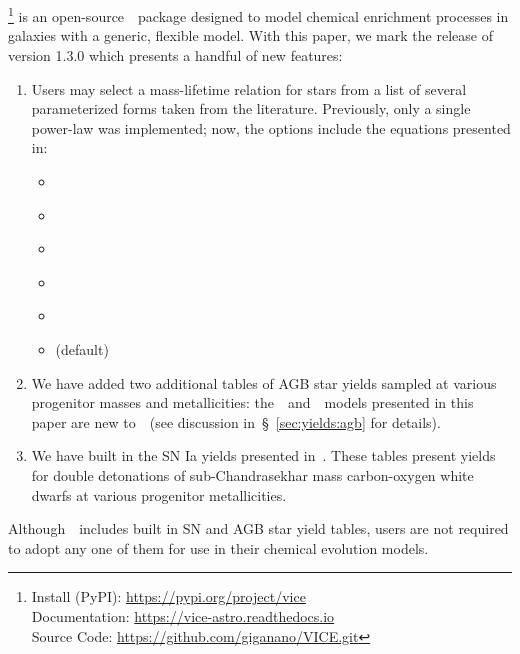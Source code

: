 \documentclass[ms.tex]{subfiles}
\begin{document}
\section{\vice}
\vice\footnote{
	Install (PyPI): \url{https://pypi.org/project/vice} \\
	Documentation: \url{https://vice-astro.readthedocs.io} \\
	Source Code: \url{https://github.com/giganano/VICE.git}
} is an open-source~\python~package designed to model chemical enrichment
processes in galaxies with a generic, flexible model.
With this paper, we mark the release of version 1.3.0 which presents a handful
of new features:
\begin{enumerate}
	\item Users may select a mass-lifetime relation for stars from a list of
	several parameterized forms taken from the literature.
	Previously, only a single power-law was implemented; now, the options
	include the equations presented in:
	\begin{itemize}
		\item \citet{Vincenzo2016b}

		\item \citet*{Hurley2000}

		\item \citet{Kodama1997}

		\item \citet{Padovani1993}

		\item \citet{Maeder1989}

		\item \citet{Larson1974} {\color{red} (default)}
	\end{itemize}

	\item We have added two additional tables of AGB star yields sampled at
	various progenitor masses and metallicities: 
	the~\karakas~and~\ventura~models presented in this paper are new
	to~\vice~(see discussion in~\S~\ref{sec:yields:agb} for details).

	\item We have built in the SN Ia yields presented in~\citet{Gronow2021a,
	Gronow2021b}.
	These tables present yields for double detonations of sub-Chandrasekhar
	mass carbon-oxygen white dwarfs at various progenitor metallicities.
\end{enumerate}
Although~\vice~includes built in SN and AGB star yield tables, users are not
required to adopt any one of them for use in their chemical evolution models.
\end{document}
